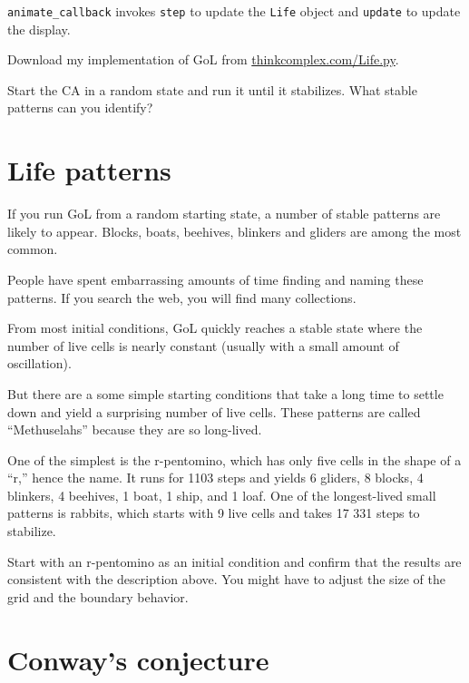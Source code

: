 \documentclass[10pt]{book}
\begin{document}
\verb"animate_callback" invokes {\tt step} to update the {\tt Life}
object and {\tt update} to update the display.

\begin{exercise}

Download my implementation of GoL from \url{thinkcomplex.com/Life.py}.

Start the CA in a random state and run it until it stabilizes.
What stable patterns can you identify?

\end{exercise}


\section{Life patterns}

If you run GoL from a random starting state, a number of stable
patterns are likely to appear.  Blocks, boats, beehives, blinkers and
gliders are among the most common.

People have spent embarrassing
amounts of time finding and naming these patterns.  If you search
the web, you will find many collections.

From most initial conditions, GoL quickly reaches a stable
state where the number of live cells is nearly constant
(usually with a small amount of oscillation).

But there are a some simple starting conditions that take a
long time to settle down and yield a surprising
number of live cells.  These patterns are called ``Methuselahs''
because they are so long-lived.

One of the simplest is the
r-pentomino, which has only five cells in the shape of a ``r,'' hence
the name.  It runs for 1103 steps and yields 6 gliders, 8 blocks, 4
blinkers, 4 beehives, 1 boat, 1 ship, and 1 loaf.
One of the longest-lived small patterns is rabbits, which starts
with 9 live cells and takes 17 331 steps to stabilize.

\begin{exercise}

Start with an r-pentomino as an initial condition and confirm
that the results are consistent with the description above.
You might have to adjust the size of the grid and the boundary behavior.

\end{exercise}


\section{Conway's conjecture}
\end{document}
